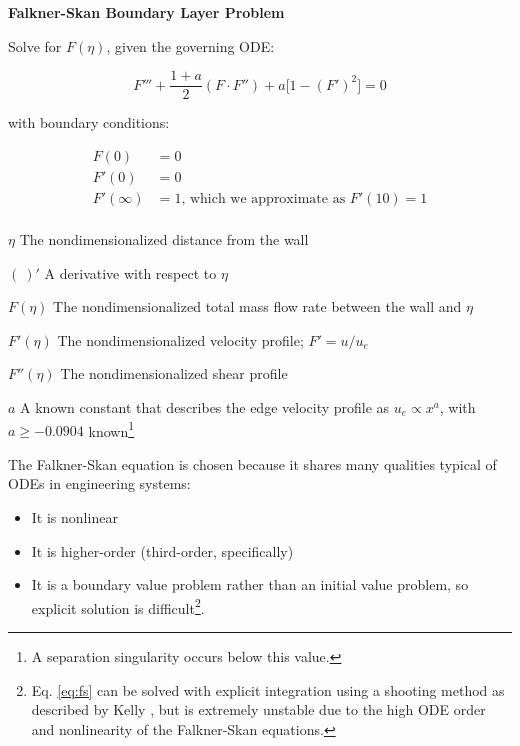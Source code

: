 \begin{example}
    \textbf{Falkner-Skan Boundary Layer Problem}

    \noindent
    Solve for $F(\eta)$, given the governing ODE:

    \begin{equation}
        F''' + \frac{1+a}{2} ( F \cdot F'' ) + a \big[1 - (F')^2 \big] = 0
        \label{eq:fs}
    \end{equation}

    \noindent
    with boundary conditions:

    \begin{equation*}
        \begin{aligned}
            F(0) &= 0 \\
            F'(0) &= 0 \\
            F'(\infty) &= 1 \text{, which we approximate as } F'(10) = 1\\
        \end{aligned}
    \end{equation*}

    \begin{eqexpl}
        \item{$\eta$} The nondimensionalized distance from the wall
        \item{$(\ )'$} A derivative with respect to $\eta$
        \item{$F(\eta)$} The nondimensionalized total mass flow rate between the wall and $\eta$
        \item{$F'(\eta)$} The nondimensionalized velocity profile; $F' = u / u_e$
        \item{$F''(\eta)$} The nondimensionalized shear profile
        \item{$a$} A known constant that describes the edge velocity profile as $u_e \propto x^a$, with $a \geq -0.0904$ known\footnote{A separation singularity occurs below this value.}
    \end{eqexpl}


\end{example}

The Falkner-Skan equation is chosen because it shares many qualities typical of ODEs in engineering systems:

\begin{itemize}[noitemsep]
    \item It is nonlinear
    \item It is higher-order (third-order, specifically)
    \item It is a boundary value problem rather than an initial value problem, so explicit solution is difficult\footnote{Eq. \ref{eq:fs} can be solved with explicit integration using a shooting method as described by Kelly \cite{mpk2017}, but is extremely unstable due to the high ODE order and nonlinearity of the Falkner-Skan equations.}.
\end{itemize}

